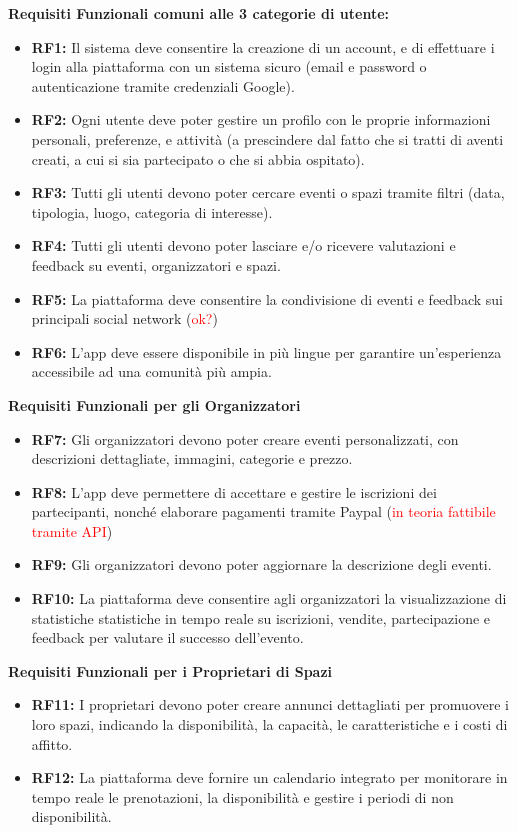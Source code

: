 \documentclass[9pt]{extarticle}
\begin{document}
\textbf{Requisiti Funzionali comuni alle 3 categorie di utente:}
\begin{itemize}
	\item \textbf{RF1:} Il sistema deve consentire la creazione di un account, e di effettuare i login alla piattaforma con un sistema sicuro (email e password o autenticazione tramite credenziali Google).
	\item \textbf{RF2:} Ogni utente deve poter gestire un profilo con le proprie informazioni personali, preferenze, e attività (a prescindere dal fatto che si tratti di aventi creati, a cui si sia partecipato o che si abbia ospitato).
	\item \textbf{RF3:} Tutti gli utenti devono poter cercare eventi o spazi tramite filtri (data, tipologia, luogo, categoria di interesse).
	\item \textbf{RF4:} Tutti gli utenti devono poter lasciare e/o ricevere valutazioni e feedback su eventi, organizzatori e spazi.
	\item \textbf{RF5:} La piattaforma deve consentire la condivisione di eventi e feedback sui principali social network (\textcolor{red}{ok?})
	\item \textbf{RF6:} L'app deve essere disponibile in più lingue per garantire un'esperienza accessibile ad una comunità più ampia.	
\end{itemize}



\textbf{Requisiti Funzionali per gli Organizzatori}
\begin{itemize}
	\item \textbf{RF7:} Gli organizzatori devono poter creare eventi personalizzati, con descrizioni dettagliate, immagini, categorie e prezzo.
	\item \textbf{RF8:} L’app deve permettere di accettare e gestire le iscrizioni dei partecipanti, nonché elaborare pagamenti tramite Paypal (\textcolor{red}{in teoria fattibile tramite API})
	\item \textbf{RF9:} Gli organizzatori devono poter aggiornare la descrizione degli eventi.
	\item \textbf{RF10:} La piattaforma deve consentire agli organizzatori la visualizzazione di statistiche statistiche in tempo reale su iscrizioni, vendite, partecipazione e feedback per valutare il successo dell’evento.
\end{itemize}

\textbf{Requisiti Funzionali per i Proprietari di Spazi}
\begin{itemize}
	\item \textbf{RF11:} I proprietari devono poter creare annunci dettagliati per promuovere i loro spazi, indicando la disponibilità, la capacità, le caratteristiche e i costi di affitto.
	\item \textbf{RF12:} La piattaforma deve fornire un calendario integrato per monitorare in tempo reale le prenotazioni, la disponibilità e gestire i periodi di non disponibilità.
\end{itemize}
\end{document}

